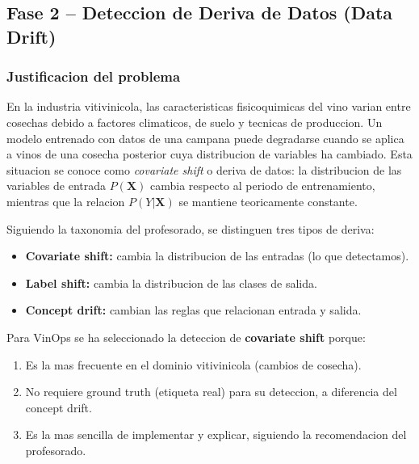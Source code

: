 
\subsection{Fase 2 -- Deteccion de Deriva de Datos (Data Drift)}

\subsubsection{Justificacion del problema}

En la industria vitivinicola, las caracteristicas fisicoquimicas del vino varian entre cosechas debido a factores climaticos, de suelo y tecnicas de produccion. Un modelo entrenado con datos de una campana puede degradarse cuando se aplica a vinos de una cosecha posterior cuya distribucion de variables ha cambiado. Esta situacion se conoce como \textit{covariate shift} o deriva de datos: la distribucion de las variables de entrada $P(\mathbf{X})$ cambia respecto al periodo de entrenamiento, mientras que la relacion $P(Y|\mathbf{X})$ se mantiene teoricamente constante.

Siguiendo la taxonomia del profesorado, se distinguen tres tipos de deriva:
\begin{itemize}
    \item \textbf{Covariate shift:} cambia la distribucion de las entradas (lo que detectamos).
    \item \textbf{Label shift:} cambia la distribucion de las clases de salida.
    \item \textbf{Concept drift:} cambian las reglas que relacionan entrada y salida.
\end{itemize}

Para VinOps se ha seleccionado la deteccion de \textbf{covariate shift} porque:
\begin{enumerate}
    \item Es la mas frecuente en el dominio vitivinicola (cambios de cosecha).
    \item No requiere ground truth (etiqueta real) para su deteccion, a diferencia del concept drift.
    \item Es la mas sencilla de implementar y explicar, siguiendo la recomendacion del profesorado.
\end{enumerate}

